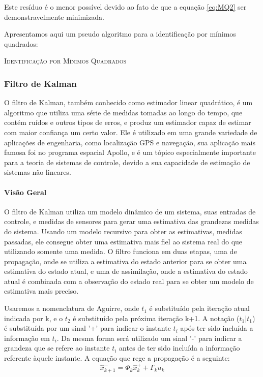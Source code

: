 Este resíduo é o menor possível devido ao fato de que a equação \eqref{eq:MQ2} ser demonstravelmente minimizada.


Apresentamos aqui um pseudo algoritmo para a identificação por mínimos quadrados:

\IncMargin{1em}
\begin{algorithm}[H]

	\Retorna{$\theta$}
	\label{alg:mq}
	\caption{\textsc{Identificação por Mínimos Quadrados}}
\end{algorithm}
\DecMargin{1em}


\subsubsection {Filtro de Kalman}
O filtro de Kalman, também conhecido como estimador linear quadrático, é um algoritmo que utiliza uma série de medidas tomadas ao longo do tempo, que contém ruídos e outros tipos de erros, e produz um estimador capaz de estimar com maior confiança um certo valor. Ele é utilizado em uma grande variedade de aplicações de engenharia, como localização GPS e navegação, sua aplicação mais famosa foi no programa espacial Apollo, e é um tópico especialmente importante para a teoria de sistemas de controle, devido a sua capacidade de estimação de sistemas não lineares.
\paragraph{Visão Geral}
O filtro de Kalman utiliza um modelo dinâmico de um sistema, suas entradas de controle, e medidas de sensores para gerar uma estimativa das grandezas medidas do sistema. Usando um modelo recursivo para obter as estimativas, medidas passadas, ele consegue obter uma estimativa mais fiel ao sistema real do que utilizando somente uma medida. O filtro funciona em duas etapas, uma de propagação, onde se utiliza a estimativa do estado anterior para se obter uma estimativa do estado atual, e uma de assimilação, onde a estimativa do estado atual é combinada com a observação do estado real para se obter um modelo de estimativa mais preciso. 


Usaremos a nomenclatura de Aguirre, onde $t_1$ é substituído pela iteração atual indicada por k, e o $t_2$ é substituído pela próxima iteração k+1. A notação ($t_1$|$t_1$) é substituída por um sinal '+' para indicar o instante $t_i$ após ter sido incluída a informação em $t_i$. Da mesma forma será utilizado um sinal '-' para indicar a grandeza que se refere ao instante $t_i$ antes de ter sido incluída a informação referente àquele instante. A equação que rege a propagação é a seguinte:
\begin{equation} \label{eq:prop}
\hat{x}^{-}_{k+1}=\Phi_k \hat{x}^+_k+\Gamma_ku_k
\end{equation}

